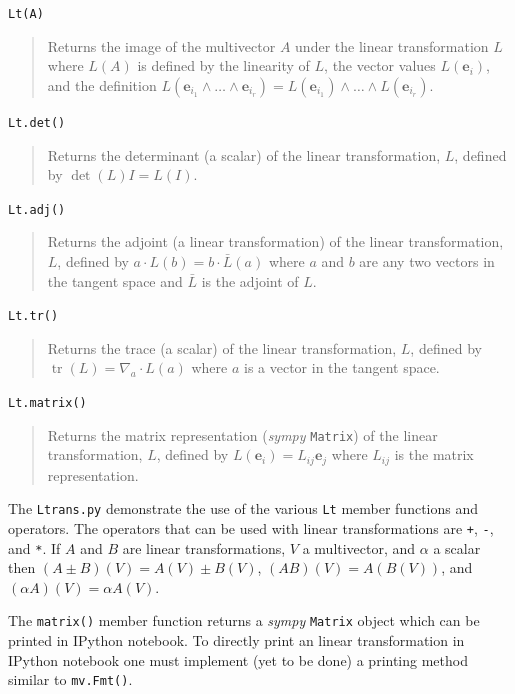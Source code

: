 \documentclass[12pt]{report}
\newcommand{\bm}[1]{\boldsymbol{#1}}
\newcommand{\ebf}{\bm{e}}
\newcommand{\lp}{\left (}
\newcommand{\rp}{\right )}
\newcommand{\W}{\wedge}
\newcommand{\f}[2]{{#1}\lp {#2} \rp}
\newcommand{\paren}[1]{\lp {#1} \rp}
\newcommand{\T}[1]{\texttt{#1}}
\begin{document}
\T{Lt(A)}
\begin{quote}
    Returns the image of the multivector $A$ under the linear transformation $L$ where $\f{L}{A}$ is defined by the
    linearity of $L$, the vector values $\f{L}{\ebf_{i}}$, and the definition
    $\f{L}{\ebf_{i_{1}}\W\dots\W\ebf_{i_{r}}} = \f{L}{\ebf_{i_{1}}}\W\dots\W\f{L}{\ebf_{i_{r}}}$.
\end{quote}
\T{Lt.det()}
\begin{quote}
    Returns the determinant (a scalar) of the linear transformation, $L$, defined by $\f{\det}{L}I = \f{L}{I}$.
\end{quote}
\T{Lt.adj()}
\begin{quote}
    Returns the adjoint (a linear transformation) of the linear transformation, $L$, defined by $a\cdot\f{L}{b} = b\cdot\f{\bar{L}}{a}$ where
    $a$ and $b$ are any two vectors in the tangent space and $\bar{L}$ is the adjoint of $L$.
\end{quote}
\T{Lt.tr()}
\begin{quote}
    Returns the trace (a scalar) of the linear transformation, $L$, defined by
    $\f{\operatorname{tr}}{L}=\nabla_{a}\cdot\f{L}{a}$ where $a$ is a vector in the tangent space.
\end{quote}
\T{Lt.matrix()}
\begin{quote}
    Returns the matrix representation (\emph{sympy} \T{Matrix}) of the linear transformation, $L$, defined by
    $\f{L}{\ebf_{i}} = L_{ij}\ebf_{j}$ where $L_{ij}$ is the matrix representation.
\end{quote}
The \T{Ltrans.py} demonstrate the use of the various \T{Lt} member functions and operators. The operators that can be used with
linear transformations are \T{+}, \T{-}, and \T{*}. If $A$ and $B$ are linear transformations, $V$ a multivector, and $\alpha$ a
scalar then $\f{\paren{A\pm B}}{V} = \f{A}{V}\pm\f{B}{V}$, $\f{\paren{AB}}{V} = \f{A}{\f{B}{V}}$, and
$\f{\paren{\alpha A}}{V} = \alpha\f{A}{V}$.

The \T{matrix()} member function returns a \emph{sympy} \T{Matrix} object which can be printed in IPython notebook.  To directly print
an linear transformation in IPython notebook one must implement (yet to be done) a printing method similar to \T{mv.Fmt()}.
\end{document}
